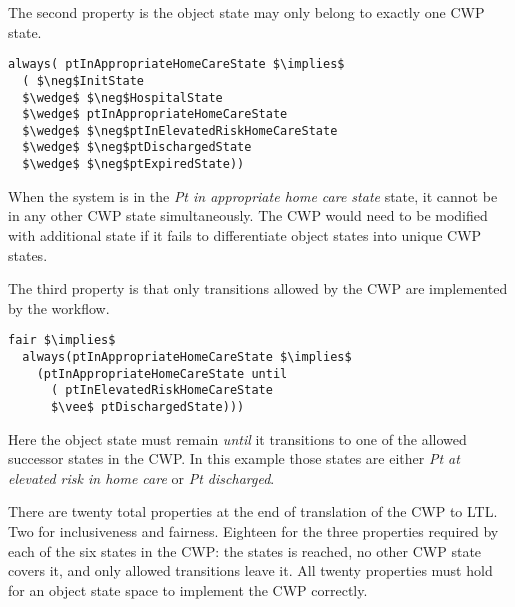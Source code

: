 The second property is the object state may only belong to exactly one CWP state.
%
{\small
\begin{lstlisting}[style=myPromela,mathescape=true]
always( ptInAppropriateHomeCareState $\implies$ 
  ( $\neg$InitState
  $\wedge$ $\neg$HospitalState 
  $\wedge$ ptInAppropriateHomeCareState 
  $\wedge$ $\neg$ptInElevatedRiskHomeCareState 
  $\wedge$ $\neg$ptDischargedState 
  $\wedge$ $\neg$ptExpiredState))
\end{lstlisting}
}
%
\noindent When the system is in the \emph{Pt in appropriate home care state} state, it cannot be in any other CWP state simultaneously.
The CWP would need to be modified with additional state if it fails to differentiate object states into unique CWP states.

The third property is that only transitions allowed by the CWP are implemented by the workflow.
%
{\small
\begin{lstlisting}[style=myPromela,mathescape=true]
fair $\implies$ 
  always(ptInAppropriateHomeCareState $\implies$ 
    (ptInAppropriateHomeCareState until
      ( ptInElevatedRiskHomeCareState
      $\vee$ ptDischargedState)))
\end{lstlisting}
}
%
\noindent Here the object state must remain \emph{until} it transitions to one of the allowed successor states in the CWP.
In this example those states are either \emph{Pt at elevated risk in home care} or \emph{Pt discharged}.

There are twenty total properties at the end of translation of the CWP to LTL.
Two for inclusiveness and fairness.
Eighteen for the three properties required by each of the six states in the CWP: the states is reached, no other CWP state covers it, and only allowed transitions leave it.
All twenty properties must hold for an object state space to implement the CWP correctly.